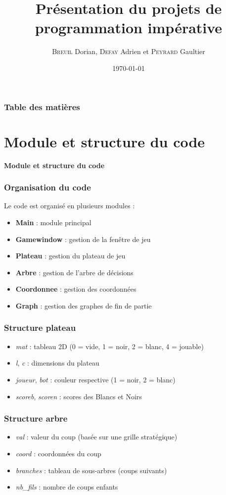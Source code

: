 \documentclass[9pt]{beamer}
\title{Présentation du projets de programmation impérative}
\author{\textsc{Breuil} Dorian, \textsc{Defay} Adrien et \textsc{Peyrard} Gaultier}
\date{\today}
\begin{document}
\frame{\titlepage}  %

\begin{frame}
  \frametitle{Table des matières}
  \tableofcontents
  
\end{frame}

\section{Module et structure du code}
\begin{frame}
  \begin{center}
      \Large \textbf{Module et structure du code}
  \end{center}
\end{frame}

\begin{frame}
  \frametitle{Organisation du code}
  Le code est organisé en plusieurs modules :
  \begin{itemize}
  \item \textbf{Main} : module principal
  \item \textbf{Gamewindow} : gestion de la fenêtre de jeu
  \item \textbf{Plateau} : gestion du plateau de jeu
  \item \textbf{Arbre} : gestion de l’arbre de décisions
  \item \textbf{Coordonnee} : gestion des coordonnées
  \item \textbf{Graph} : gestion des graphes de fin de partie
  \end{itemize}
\end{frame}

\begin{frame}
  \frametitle{Structure plateau}
  \begin{itemize}
    \item \textit{mat} : tableau 2D (0 = vide, 1 = noir, 2 = blanc, 4 = jouable)
    \item \textit{l}, \textit{c} : dimensions du plateau
    \item \textit{joueur}, \textit{bot} : couleur respective (1 = noir, 2 = blanc)
    \item \textit{scoreb}, \textit{scoren} : scores des Blancs et Noirs
  \end{itemize}
\end{frame}

\begin{frame}
  \frametitle{Structure arbre}
  \begin{itemize}
    \item \textit{val} :  valeur du coup (basée sur une grille stratégique)
    \item \textit{coord} : coordonnées du coup
    \item \textit{branches} : tableau de sous-arbres (coups suivants)
    \item \textit{nb\_fils} : nombre de coups enfants
  \end{itemize}
\end{frame}
\end{document}
